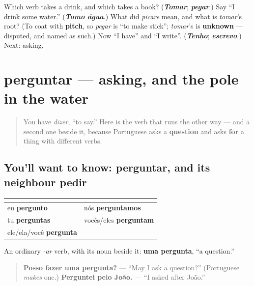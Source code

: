 \begin{tcolorbox}[breakable,colback=teal!4,colframe=teal!35!black,title={Before you move on}]
Which verb takes a drink, and which takes a book? (\emph{\textbf{Tomar}}; \emph{\textbf{pegar}}.) Say \textquotedblleft{}I drink some water.\textquotedblright{} (\emph{\textbf{Tomo água}}.) What did \emph{picāre} mean, and what is \emph{tomar}'s root? (To coat with \textbf{pitch}, so \emph{pegar} is \textquotedblleft{}to make stick\textquotedblright{}; \emph{tomar}'s is \textbf{unknown} — disputed, and named as such.) Now \textquotedblleft{}I have\textquotedblright{} and \textquotedblleft{}I write\textquotedblright{}. (\emph{\textbf{Tenho}}; \emph{\textbf{escrevo}}.) Next: asking.
\end{tcolorbox}
\section[perguntar]{perguntar — asking, and the pole in the water}

\label{lesson:PT-C20-perguntar}



\begin{quote}
You have \emph{dizer}, \textquotedblleft{}to say.\textquotedblright{} Here is the verb that runs the other way — and a second one beside it, because Portuguese asks a \textbf{question} and asks \textbf{for} a thing with different verbs.
\end{quote}

\subsection*{You'll want to know: perguntar, and its neighbour pedir}
\noindent
\begin{tabularx}{\linewidth}{@{}>{\raggedright\arraybackslash}X>{\raggedright\arraybackslash}X@{}}
\toprule
\textbf{} & \textbf{} \\
\midrule
eu \textbf{pergunto} & nós \textbf{perguntamos} \\
tu \textbf{perguntas} & vocês/eles \textbf{perguntam} \\
ele/ela/você \textbf{pergunta} &  \\
\bottomrule
\end{tabularx}

An ordinary \emph{-ar} verb, with its noun beside it: \textbf{uma pergunta}, \textquotedblleft{}a question.\textquotedblright{}

\begin{quote}
\textbf{Posso fazer uma pergunta?} — \textquotedblleft{}May I ask a question?\textquotedblright{} (Portuguese \emph{makes} one.) \textbf{Perguntei pelo João.} — \textquotedblleft{}I asked after João.\textquotedblright{}
\end{quote}

